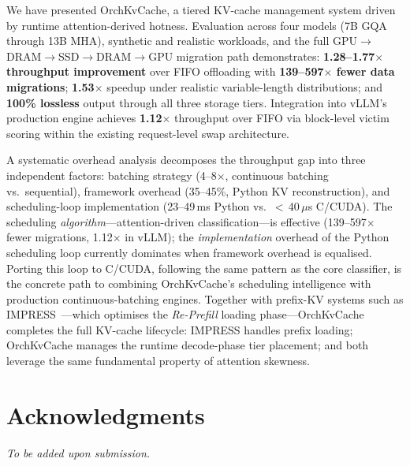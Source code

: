 \documentclass[conference]{IEEEtran}
\begin{document}
We have presented OrchKvCache, a tiered KV-cache management system driven by runtime attention-derived hotness. Evaluation across four models (7B GQA through 13B MHA), synthetic and realistic workloads, and the full GPU$\to$DRAM$\to$SSD$\to$DRAM$\to$GPU migration path demonstrates: \textbf{1.28--1.77$\times$ throughput improvement} over FIFO offloading with \textbf{139--597$\times$ fewer data migrations}; \textbf{1.53$\times$} speedup under realistic variable-length distributions; and \textbf{100\% lossless} output through all three storage tiers. Integration into vLLM's production engine achieves \textbf{1.12$\times$} throughput over FIFO via block-level victim scoring within the existing request-level swap architecture.

A systematic overhead analysis decomposes the throughput gap into three independent factors: batching strategy (4--8$\times$, continuous batching vs.\ sequential), framework overhead (35--45\%, Python KV reconstruction), and scheduling-loop implementation (23--49\,ms Python vs.\ $<$\,40\,$\mu$s C/CUDA). The scheduling \emph{algorithm}---attention-driven classification---is effective (139--597$\times$ fewer migrations, 1.12$\times$ in vLLM); the \emph{implementation} overhead of the Python scheduling loop currently dominates when framework overhead is equalised. Porting this loop to C/CUDA, following the same pattern as the core classifier, is the concrete path to combining OrchKvCache's scheduling intelligence with production continuous-batching engines. Together with prefix-KV systems such as IMPRESS~\cite{impress}---which optimises the \emph{Re-Prefill} loading phase---OrchKvCache completes the full KV-cache lifecycle: IMPRESS handles prefix loading; OrchKvCache manages the runtime decode-phase tier placement; and both leverage the same fundamental property of attention skewness.

\section*{Acknowledgments}
\textit{To be added upon submission.}
\end{document}
